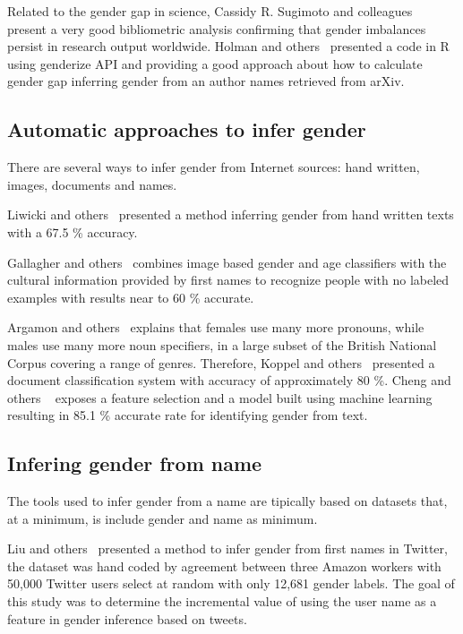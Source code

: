 \documentclass[a4paper]{article}
\begin{document}
Related to the gender gap in science, Cassidy R. Sugimoto and
colleagues~\cite{lariviere2013bibliometrics}
present a very good bibliometric analysis confirming that gender
imbalances persist in research output worldwide. Holman and
others~\cite{holman2018gender} presented a code in R
using genderize API and providing a good approach
about how to calculate gender gap inferring gender from an author
names retrieved from arXiv. 

\subsection{Automatic approaches to infer gender}

There are several ways to infer gender from Internet
sources: hand written, images, documents and names.

Liwicki and others~\cite{liwicki2011automatic} presented a method
inferring gender from hand written texts with a 67.5 \% accuracy.

Gallagher and others~\cite{gallagher2008estimating} combines
image based gender and age classifiers with the cultural 
information provided by first names to recognize people
with no labeled examples with results near to 60 \% accurate.

Argamon and others~\cite{argamon2003gender} explains that
females use many more pronouns, while males use many more
noun specifiers, in a large subset of the British National
Corpus covering a range of genres. Therefore,
Koppel and others~\cite{koppel2002automatically} presented
a document classification system with accuracy of
approximately 80 \%. Cheng and others ~\cite{cheng2011author}
exposes a feature selection and a model built using machine learning
resulting in 85.1 \% accurate rate for identifying gender from text.

\subsection{Infering gender from name}

The tools used to infer gender from a name are tipically based on
datasets that, at a minimum, is include gender and name as minimum.

Liu and others~\cite{liu2013s} presented a method to infer gender
from first names in Twitter, the dataset was hand coded by agreement
between three Amazon workers with 50,000 Twitter users select at
random with only 12,681 gender labels. The goal of this study was
to determine the incremental value of using the user name as a feature
in gender inference based on tweets.
\end{document}
